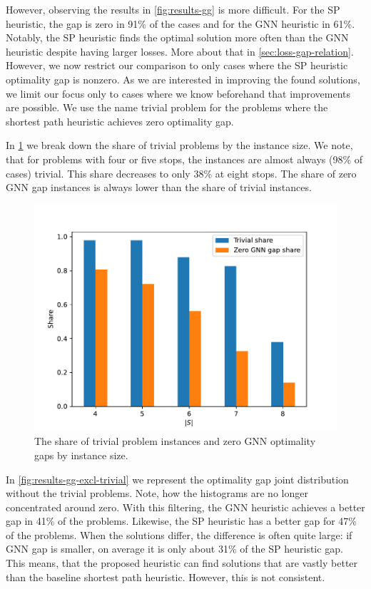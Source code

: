 \documentclass[english, 12pt, a4paper, sci, utf8, a-2b, online]{aaltothesis}
\begin{document}
However, observing the results in \cref{fig:results-gg} is more difficult. For the SP heuristic, the gap is zero in 91\% of the cases and for the GNN heuristic in 61\%. Notably, the SP heuristic finds the optimal solution more often than the GNN heuristic despite having larger losses. More about that in \cref{sec:loss-gap-relation}. However, we now restrict our comparison to only cases where the SP heuristic optimality gap is nonzero. As we are interested in improving the found solutions, we limit our focus only to cases where we know beforehand that improvements are possible. We use the name trivial problem for the problems where the shortest path heuristic achieves zero optimality gap.

In \cref{fig:trivial-shares-in-data} we break down the share of trivial problems by the instance size. We note, that for problems with four or five stops, the instances are almost always (98\% of cases) trivial. This share decreases to only 38\% at eight stops. The share of zero GNN gap instances is always lower than the share of trivial instances.

\begin{figure}
    \centering
    \includegraphics[width=\textwidth]{figures/zero_gap_shares.pdf}
    \caption{The share of trivial problem instances and zero GNN optimality gaps by instance size.}
    \label{fig:trivial-shares-in-data}
\end{figure}


In \cref{fig:results-gg-excl-trivial} we represent the optimality gap joint distribution without the trivial problems. Note, how the histograms are no longer concentrated around zero. With this filtering, the GNN heuristic achieves a better gap in 41\% of the problems. Likewise, the SP heuristic has a better gap for 47\% of the problems. When the solutions differ, the difference is often quite large: if GNN gap is smaller, on average it is only about 31\% of the SP heuristic gap. This means, that the proposed heuristic can find solutions that are vastly better than the baseline shortest path heuristic. However, this is not consistent.
\end{document}

